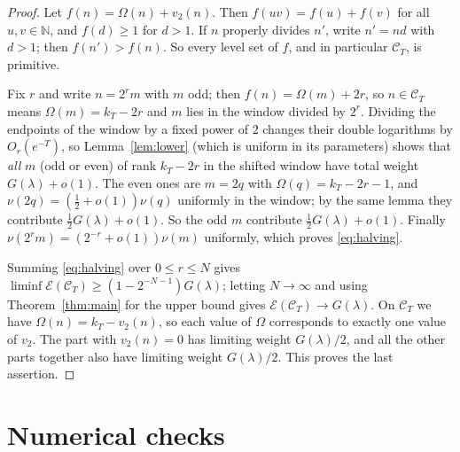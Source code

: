 \documentclass[11pt,a4paper]{article}
\numberwithin{equation}{section}
\theoremstyle{plain}
\theoremstyle{definition}
\theoremstyle{remark}
\newcommand{\N}{\mathbb{N}}
\newcommand{\cE}{\mathcal{E}}
\newcommand{\cC}{\mathcal{C}}
\begin{document}
\begin{proof}
Let $f(n)=\Omega(n)+v_2(n)$. Then $f(uv)=f(u)+f(v)$ for all $u,v\in\N$, and $f(d)\ge1$ for $d>1$. If $n$ properly divides $n'$, write $n'=nd$ with $d>1$; then $f(n')>f(n)$. So every level set of $f$, and in particular $\cC_T$, is primitive.

Fix $r$ and write $n=2^rm$ with $m$ odd; then $f(n)=\Omega(m)+2r$, so $n\in\cC_T$ means $\Omega(m)=k_T-2r$ and $m$ lies in the window divided by $2^r$. Dividing the endpoints of the window by a fixed power of $2$ changes their double logarithms by $O_r(e^{-T})$, so Lemma~\ref{lem:lower} (which is uniform in its parameters) shows that \emph{all} $m$ (odd or even) of rank $k_T-2r$ in the shifted window have total weight $G(\lambda)+o(1)$. The even ones are $m=2q$ with $\Omega(q)=k_T-2r-1$, and $\nu(2q)=(\frac12+o(1))\nu(q)$ uniformly in the window; by the same lemma they contribute $\frac12G(\lambda)+o(1)$. So the odd $m$ contribute $\frac12G(\lambda)+o(1)$. Finally $\nu(2^rm)=(2^{-r}+o(1))\nu(m)$ uniformly, which proves \eqref{eq:halving}.

Summing \eqref{eq:halving} over $0\le r\le N$ gives $\liminf\cE(\cC_T)\ge(1-2^{-N-1})G(\lambda)$; letting $N\to\infty$ and using Theorem~\ref{thm:main} for the upper bound gives $\cE(\cC_T)\to G(\lambda)$. On $\cC_T$ we have $\Omega(n)=k_T-v_2(n)$, so each value of $\Omega$ corresponds to exactly one value of $v_2$. The part with $v_2(n)=0$ has limiting weight $G(\lambda)/2$, and all the other parts together also have limiting weight $G(\lambda)/2$. This proves the last assertion.
\end{proof}

\appendix
\section{Numerical checks}\label{app:verification}
\end{document}
